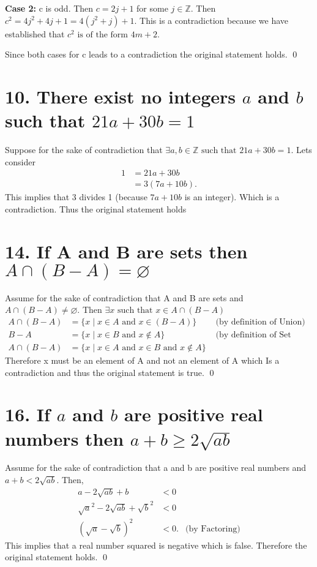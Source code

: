 \documentclass{article}
\newcommand{\ints}{\mathbb{Z}}
\newcommand{\st}{\text{ such that }}
\newcommand{\nullset}{\varnothing}
\begin{document}
	\textbf{Case 2:} c is odd.
	Then $c= 2j+1$ for some $j \in \ints$. Then $c^2 = 4j^2+4j+ 1 =4(j^2+j)+1$. 
	This is a contradiction because we have established that $c^2 \text{ is of the form } 4m + 2$.
	
	Since both cases for c leads to a contradiction the original statement holds. \qed
	
	\section*{10. There exist no integers $a$ and $b$ such that  $21a +30b = 1$}
	Suppose for the sake of contradiction that $\exists a,b \in \ints \st 21a+30b=1$. Lets consider
	\begin{align*}
		1 &= 21a+30b   \\
		  &= 3(7a+10b).
	\end{align*}
	This implies that 3 divides 1 (because $7a+10b$ is an integer). Which is a contradiction. Thus the original statement holds 
	
	\section*{14. If A and B are sets then $A \cap (B-A)= \nullset$}
	Assume for the sake of contradiction that A and B are sets and $A \cap (B-A) \neq \nullset$. Then $\exists x \st x \in A \cap (B-A)$
	\begin{align*}
		A \cap (B-A) &= \{x \mid x \in A \text{ and } x \in(B-A)\} &\text{ (by definition of Union)} \\
		B-A          &= \{x \mid x \in B \text{ and } x \not\in A\} &\text{ (by definition of Set Subtraction)} \\
		A \cap (B-A) &= \{x \mid x \in A \text{ and } x \in B \text{ and } x \not\in A\} 
	\end{align*}
	Therefore x must be an element of A and not an element of A which Is a contradiction and thus the original statement is true. \qed
	
	\section*{16. If $a$ and $b$ are positive real numbers then $a+b \ge 2\sqrt{ab}$}
	Assume for the sake of contradiction that a and b are positive real numbers and $a+b < 2\sqrt{ab}$.
	Then,
	\begin{align*}
		a-2\sqrt{ab}+b &<0\\  
		\sqrt{a}^2-2\sqrt{ab}+\sqrt{b}^2 &<0\\
		(\sqrt{a}-\sqrt{b})^2 &<0. & \text{(by Factoring)}
	\end{align*}
	This implies that a real number squared is negative which is false. Therefore the original statement holds. \qed
\end{document}
